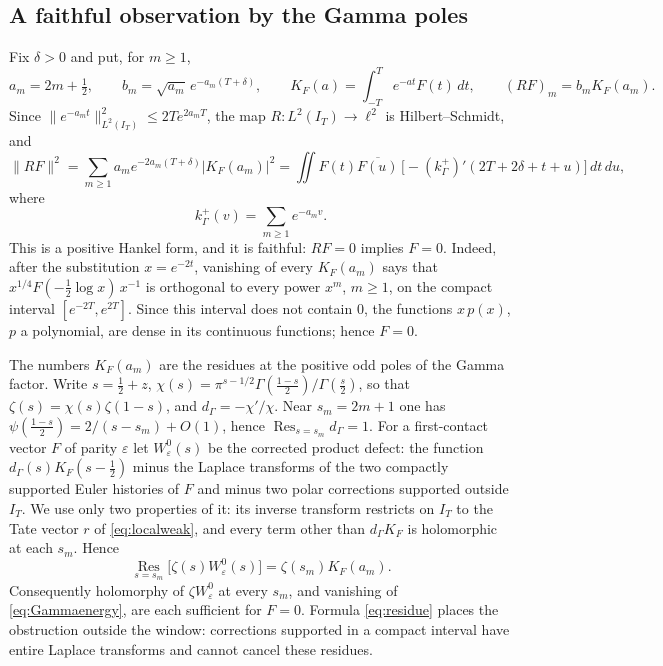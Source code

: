 \documentclass[11pt]{amsart}
\theoremstyle{definition}
\theoremstyle{remark}
\newcommand{\IT}{I_T}
\begin{document}
\subsection{A faithful observation by the Gamma poles}

Fix $\delta>0$ and put, for $m\ge1$,
\[
 a_m=2m+\tfrac12,\qquad
 b_m=\sqrt{a_m}\,e^{-a_m(T+\delta)},\qquad
 K_F(a)=\int_{-T}^T e^{-at}F(t)\,dt,\qquad
 (RF)_m=b_mK_F(a_m).
\]
Since $\|e^{-a_mt}\|^2_{L^2(\IT)}\le2Te^{2a_mT}$, the map $R:L^2(\IT)\to\ell^2$ is Hilbert--Schmidt,
and
\begin{equation}\label{eq:Gammaenergy}
 \|RF\|^2
 =\sum_{m\ge1}a_me^{-2a_m(T+\delta)}|K_F(a_m)|^2
 =\iint F(t)\overline{F(u)}\,\bigl[-(k_\Gamma^+)'(2T+2\delta+t+u)\bigr]\,dt\,du,
\end{equation}
where
\[
 k_\Gamma^+(v)=\sum_{m\ge1}e^{-a_mv}.
\]
This is a positive Hankel form, and it is faithful: $RF=0$ implies $F=0$. Indeed, after the
substitution $x=e^{-2t}$, vanishing of every $K_F(a_m)$ says that $x^{1/4}F(-\frac12\log x)\,x^{-1}$
is orthogonal to every power $x^m$, $m\ge1$, on the compact interval $[e^{-2T},e^{2T}]$. Since this
interval does not contain $0$, the functions $x\,p(x)$, $p$ a polynomial, are dense in its continuous
functions; hence $F=0$.

The numbers $K_F(a_m)$ are the residues at the positive odd poles of the Gamma factor. Write
$s=\frac12+z$, $\chi(s)=\pi^{s-1/2}\Gamma(\frac{1-s}2)/\Gamma(\frac s2)$, so that
$\zeta(s)=\chi(s)\zeta(1-s)$, and $d_\Gamma=-\chi'/\chi$. Near $s_m=2m+1$ one has
$\psi(\frac{1-s}2)=2/(s-s_m)+O(1)$, hence $\operatorname{Res}_{s=s_m}d_\Gamma=1$. For a
first-contact vector $F$ of parity $\varepsilon$ let $W^0_\varepsilon(s)$ be the corrected product
defect: the function $d_\Gamma(s)K_F(s-\frac12)$ minus the Laplace transforms of the two compactly
supported Euler histories of $F$ and minus two polar corrections supported outside $\IT$. We use only
two properties of it: its inverse transform restricts on $\IT$ to the Tate vector $r$ of
\eqref{eq:localweak}, and every term other than $d_\Gamma K_F$ is holomorphic at each $s_m$. Hence
\begin{equation}\label{eq:residue}
 \operatorname*{Res}_{s=s_m}\bigl[\zeta(s)W^0_\varepsilon(s)\bigr]
 =\zeta(s_m)K_F(a_m).
\end{equation}
Consequently holomorphy of $\zeta W^0_\varepsilon$ at every $s_m$, and vanishing of
\eqref{eq:Gammaenergy}, are each sufficient for $F=0$. Formula \eqref{eq:residue} places the
obstruction outside the window: corrections supported in a compact interval have entire Laplace
transforms and cannot cancel these residues.
\end{document}
